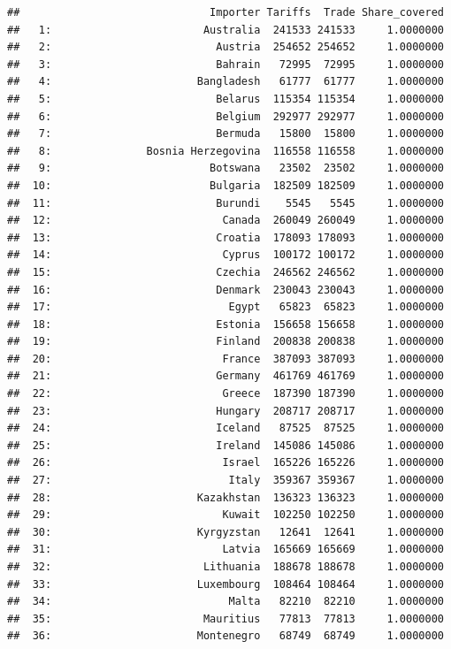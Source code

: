 \documentclass[10pt,]{article}
\begin{document}
\begin{verbatim}
##                              Importer Tariffs  Trade Share_covered
##   1:                        Australia  241533 241533     1.0000000
##   2:                          Austria  254652 254652     1.0000000
##   3:                          Bahrain   72995  72995     1.0000000
##   4:                       Bangladesh   61777  61777     1.0000000
##   5:                          Belarus  115354 115354     1.0000000
##   6:                          Belgium  292977 292977     1.0000000
##   7:                          Bermuda   15800  15800     1.0000000
##   8:               Bosnia Herzegovina  116558 116558     1.0000000
##   9:                         Botswana   23502  23502     1.0000000
##  10:                         Bulgaria  182509 182509     1.0000000
##  11:                          Burundi    5545   5545     1.0000000
##  12:                           Canada  260049 260049     1.0000000
##  13:                          Croatia  178093 178093     1.0000000
##  14:                           Cyprus  100172 100172     1.0000000
##  15:                          Czechia  246562 246562     1.0000000
##  16:                          Denmark  230043 230043     1.0000000
##  17:                            Egypt   65823  65823     1.0000000
##  18:                          Estonia  156658 156658     1.0000000
##  19:                          Finland  200838 200838     1.0000000
##  20:                           France  387093 387093     1.0000000
##  21:                          Germany  461769 461769     1.0000000
##  22:                           Greece  187390 187390     1.0000000
##  23:                          Hungary  208717 208717     1.0000000
##  24:                          Iceland   87525  87525     1.0000000
##  25:                          Ireland  145086 145086     1.0000000
##  26:                           Israel  165226 165226     1.0000000
##  27:                            Italy  359367 359367     1.0000000
##  28:                       Kazakhstan  136323 136323     1.0000000
##  29:                           Kuwait  102250 102250     1.0000000
##  30:                       Kyrgyzstan   12641  12641     1.0000000
##  31:                           Latvia  165669 165669     1.0000000
##  32:                        Lithuania  188678 188678     1.0000000
##  33:                       Luxembourg  108464 108464     1.0000000
##  34:                            Malta   82210  82210     1.0000000
##  35:                        Mauritius   77813  77813     1.0000000
##  36:                       Montenegro   68749  68749     1.0000000

\end{verbatim}
\end{document}
